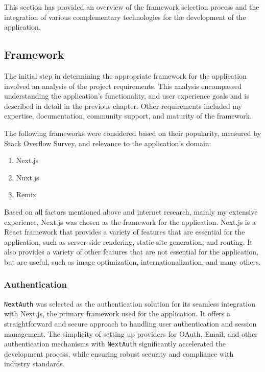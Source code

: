 This section has provided an overview of the framework selection process and the integration of various complementary technologies for the development of the application.

\subsection{Framework}

The initial step in determining the appropriate framework\cite{choose-tech-stack} for the application involved an analysis of the project requirements. This analysis encompassed understanding the application's functionality, and user experience goals and is described in detail in the previous chapter. Other requirements included my expertise, documentation, community support, and maturity of the framework.

The following frameworks were considered based on their popularity, measured by Stack Overflow Survey\cite{stack-overflow}, and relevance to the application's domain:

\begin{enumerate}
    \item Next.js
    \item Nuxt.js
    \item Remix
\end{enumerate}

Based on all factors mentioned above and internet research\cite{why-next}, mainly my extensive experience, Next.js was chosen as the framework for the application. Next.js is a React framework that provides a variety of features that are essential for the application, such as server-side rendering, static site generation, and routing. It also provides a variety of other features that are not essential for the application, but are useful, such as image optimization, internationalization, and many others.\cite{nextjs}

\subsubsection{Authentication}

\texttt{NextAuth} was selected as the authentication solution for its seamless integration with Next.js, the primary framework used for the application. It offers a straightforward and secure approach to handling user authentication and session management.\cite{why-next-auth} The simplicity of setting up providers for OAuth, Email, and other authentication mechanisms with \texttt{NextAuth} significantly accelerated the development process, while ensuring robust security and compliance with industry standards.

